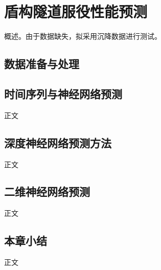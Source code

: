 \chapter{盾构隧道服役性能预测}
\label{chap:prediction}

概述。由于数据缺失，拟采用沉降数据进行测试。



\section{数据准备与处理}





\section{时间序列与神经网络预测}

正文




\section{深度神经网络预测方法}

正文




\section{二维神经网络预测}

正文




\section{本章小结}

正文